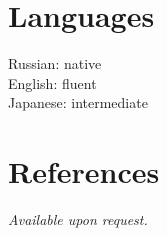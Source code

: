\documentclass[margin,line]{CV}
\begin{document}
\begin{resume}
    \section{\mysidestyle Languages}
    Russian: native \\
    English: fluent \\
    Japanese: intermediate


    \section{\mysidestyle References}
    {\sl Available upon request.}

\end{resume}
\end{document}
